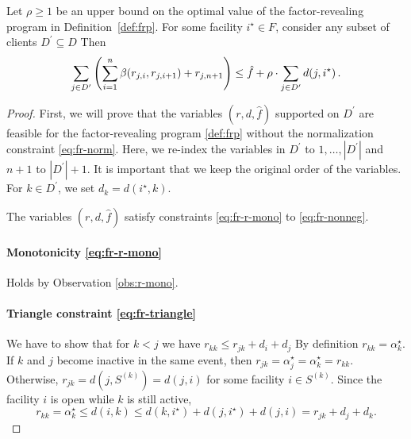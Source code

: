 \begin{lemma}
\label{lem:star-cost}
    Let $\rho \geq 1$ be an upper bound on the optimal value of the factor-revealing program in Definition~\ref{def:frp}. 
    For some facility $i^\star \in F$, consider any subset of clients $D^\prime \subseteq D$
    Then
    \[
    \sum_{j \in D^\prime} \left(\sum_{i=1}^n \beta(r_{j,i}, r_{j,i+1}) + r_{j,n+1}\right) \leq \hat{f} + \rho \cdot \sum_{j \in D^\prime} d(j, i^\star)\,.
    \]
\end{lemma}
\begin{proof}
First, we will prove that the variables $(r,d,\hat f)$ supported on $D^\prime$ are feasible for the factor-revealing program \ref{def:frp} without the normalization constraint \ref{eq:fr-norm}. Here, we re-index the variables in $D^\prime$ to $1, \dots, |D^\prime|$ and $n+1$ to $|D^\prime|+1$. It is important that we keep the original order of the variables. For $k \in D^\prime$, we set $d_k = d(i^\star,k)$. 
\begin{claim}
    The variables $(r,d,\hat f)$ satisfy constraints \eqref{eq:fr-r-mono} to \eqref{eq:fr-nonneg}.
\end{claim}
\paragraph{Monotonicity \eqref{eq:fr-r-mono}} Holds by Observation \ref{obs:r-mono}.
\paragraph{Triangle constraint \eqref{eq:fr-triangle}} 
We have to show that for $k < j$ we have $r_{kk} \le r_{jk} + d_i + d_j$
By definition $r_{kk} = \alpha^\star_k$. If $k$ and $j$ become inactive in the same event, then $r_{jk} = \alpha^\star_j = \alpha^\star_k = r_{kk}$. Otherwise, $r_{jk} = d(j, S^{(k)}) = d(j,i)$ for some facility $i \in S^{(k)}$. Since the facility $i$ is open while $k$ is still active,
\[
    r_{kk} = \alpha^\star_k \le d(i,k) \le d(k,i^\star) + d(j,i^\star) + d(j,i) = r_{jk} + d_j + d_k.
\]

\end{proof}
